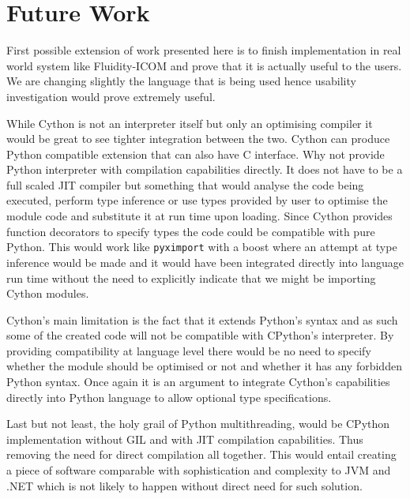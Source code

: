 \documentclass[12pt, a4paper]{report}
\begin{document}
\section{Future Work}\label{sec:future}
First possible extension of work presented here is to finish implementation
in real world system like Fluidity-ICOM and prove that it is actually
useful to the users. We are changing slightly the language that is being
used hence usability investigation would prove extremely useful.

While Cython is not an interpreter itself but only an optimising compiler
it would be great to see tighter integration between the two. Cython
can produce Python compatible extension that can also have C interface.
Why not provide Python interpreter with compilation capabilities directly.
It does not have to be a full scaled JIT compiler but something that would
analyse the code being executed, perform type inference or use types provided
by user to optimise the module code and substitute it at run time upon loading.
Since Cython provides function decorators to specify types the code could
be compatible with pure Python. This would work like \lstinline{pyximport}
with a boost where an attempt at type inference would be made and it would have
been integrated directly into language run time without the need to explicitly
indicate that we might be importing Cython modules.

Cython's main limitation is the fact that it extends Python's syntax and as
such some of the created code will not be compatible with CPython's interpreter.
By providing compatibility at language level there would be no need to specify
whether the module should be optimised or not and whether it has any forbidden
Python syntax. Once again it is an argument to integrate Cython's capabilities
directly into Python language to allow optional type specifications.

Last but not least, the holy grail of Python multithreading, would be CPython
implementation without GIL and with JIT compilation capabilities. Thus removing the need
for direct compilation all together. This would entail creating a piece of
software comparable with sophistication and complexity to JVM and .NET which
is not likely to happen without direct need for such solution.

 
\end{document}
